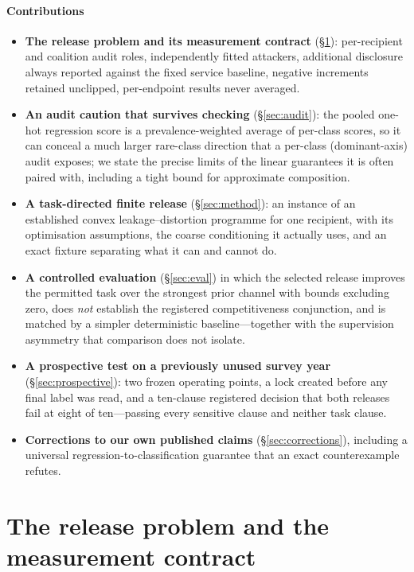 \documentclass[conference]{IEEEtran}
\begin{document}
\paragraph*{Contributions}
\begin{itemize}\itemsep2pt
\item \textbf{The release problem and its measurement contract} (\S\ref{sec:problem}): per-recipient and
coalition audit roles, independently fitted attackers, additional disclosure always reported against the
fixed service baseline, negative increments retained unclipped, per-endpoint results never averaged.
\item \textbf{An audit caution that survives checking} (\S\ref{sec:audit}): the pooled one-hot
regression score is a prevalence-weighted average of per-class scores, so it can conceal a much larger
rare-class direction that a per-class (dominant-axis) audit exposes; we state the precise limits of the
linear guarantees it is often paired with, including a tight bound for approximate composition.
\item \textbf{A task-directed finite release} (\S\ref{sec:method}): an instance of an established
convex leakage--distortion programme for one recipient, with its optimisation assumptions, the coarse
conditioning it actually uses, and an exact fixture separating what it can and cannot do.
\item \textbf{A controlled evaluation} (\S\ref{sec:eval}) in which the selected release improves the
permitted task over the strongest prior channel with bounds excluding zero, does \emph{not} establish the
registered competitiveness conjunction, and is matched by a simpler deterministic baseline---together with
the supervision asymmetry that comparison does not isolate.
\item \textbf{A prospective test on a previously unused survey year} (\S\ref{sec:prospective}): two
frozen operating points, a lock created before any final label was read, and a ten-clause registered
decision that both releases fail at eight of ten---passing every sensitive clause and neither task clause.
\item \textbf{Corrections to our own published claims} (\S\ref{sec:corrections}), including a universal
regression-to-classification guarantee that an exact counterexample refutes.
\end{itemize}

\section{The release problem and the measurement contract}
\label{sec:problem}
\end{document}
